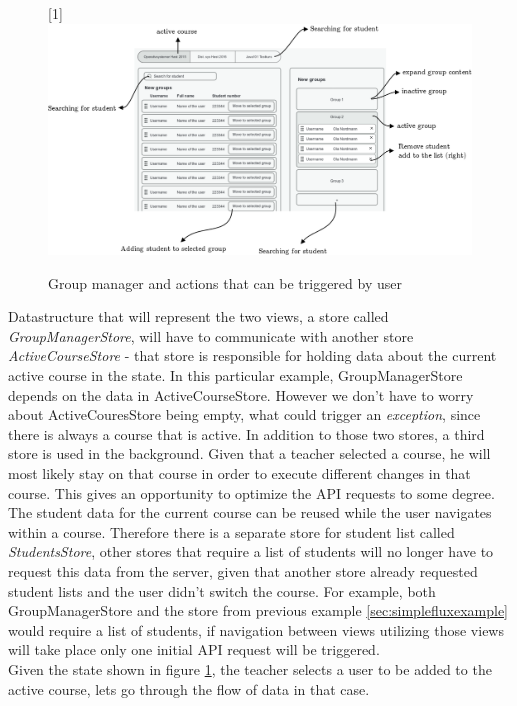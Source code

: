 \begin{figure}[h]
  \scalebox{1}[1]{{\includegraphics[width=1\linewidth]{graphics/advancedgroupmanager.png}}}
  \caption{Group manager and actions that can be triggered by user}
  \label{fig:advancedgroupmanager}
\end{figure}

Datastructure that will represent the two views, a store called \emph{GroupManagerStore}, will have to communicate with another store \emph{ActiveCourseStore} - that store is responsible for holding data about the current active course in the state. In this particular example, GroupManagerStore depends on the data in ActiveCourseStore. However we don't have to worry about ActiveCouresStore being empty, what could trigger an \emph{exception}, since there is always a course that is active. In addition to those two stores, a third store is used in the background. Given that a teacher selected a course, he will most likely stay on that course in order to execute different changes in that course. This gives an opportunity to optimize the API requests to some degree. The student data for the current course can be reused  while the user navigates within a course. Therefore there is a separate store for student list called \emph{StudentsStore}, other stores that require a list of students will no longer have to request this data from the server, given that another store already requested student lists and the user didn't switch the course. For example, both GroupManagerStore and the store from previous example \ref{sec:simplefluxexample} would require a list of students, if navigation between views utilizing those views will take place only one initial API request will be triggered.
\\Given the state shown in figure \ref{fig:advancedgroupmanager}, the teacher selects a user to be added to the active course, lets go through the flow of data in that case.

